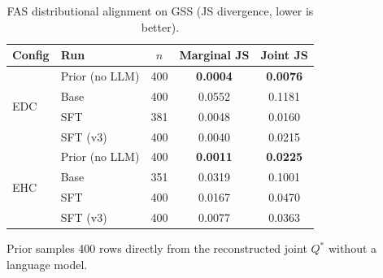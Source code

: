 \begin{table}[t]
\centering
\small
\caption{FAS distributional alignment on GSS (JS divergence, lower is better).}
\label{tab:fas}
\begin{tabular}{llccc}
\toprule
Config & Run & $n$ & Marginal JS & Joint JS \\
\midrule
\multirow{4}{*}{EDC} & Prior (no LLM) & 400 & \textbf{0.0004} & \textbf{0.0076} \\
 & Base & 400 & 0.0552 & 0.1181 \\
 & SFT & 381 & 0.0048 & 0.0160 \\
 & SFT (v3) & 400 & 0.0040 & 0.0215 \\
\midrule
\multirow{4}{*}{EHC} & Prior (no LLM) & 400 & \textbf{0.0011} & \textbf{0.0225} \\
 & Base & 351 & 0.0319 & 0.1001 \\
 & SFT & 400 & 0.0167 & 0.0470 \\
 & SFT (v3) & 400 & 0.0077 & 0.0363 \\
\bottomrule
\end{tabular}
\par\smallskip\footnotesize
Prior samples 400 rows directly from the reconstructed joint $Q^{\ast}$ without a
language model.
\end{table}
